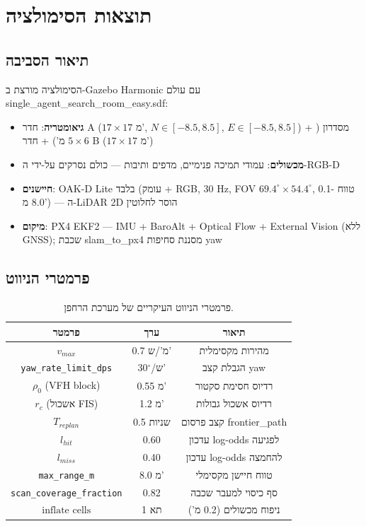 \documentclass[11pt,a4paper]{article}
\begin{document}
\section{תוצאות הסימולציה}

\subsection{תיאור הסביבה}

הסימולציה מורצת ב-\textenglish{Gazebo Harmonic} עם עולם \textenglish{single\_agent\_search\_room\_easy.sdf}:
\begin{itemize}
    \item \textbf{גיאומטריה}: חדר A ($17 \times 17$ מ', $N \in [-8.5, 8.5]$, $E \in [-8.5, 8.5]$) + מסדרון ($5 \times 6$ מ') + חדר B ($17 \times 17$ מ')
    \item \textbf{מכשולים}: עמודי תמיכה פנימיים, מדפים ותיבות — כולם נסרקים על-ידי ה-\textenglish{RGB-D}
    \item \textbf{חיישנים}: \textenglish{OAK-D Lite} בלבד (עומק + \textenglish{RGB}, 30 \textenglish{Hz}, \textenglish{FOV} $69.4^{\circ}\times54.4^{\circ}$, טווח 0.1-8.0 מ') — ה-\textenglish{LiDAR} 2D הוסר לחלוטין
    \item \textbf{מיקום}: \textenglish{PX4 EKF2} — \textenglish{IMU} + BaroAlt + Optical Flow + External Vision (ללא \textenglish{GNSS}); שכבת \textenglish{slam\_to\_px4} מסננת סחיפות \textenglish{yaw}
\end{itemize}

\subsection{פרמטרי הניווט}

\begin{table}[H]
\centering
\begin{tabular}{ccc}
\toprule
\textbf{פרמטר} & \textbf{ערך} & \textbf{תיאור} \\
\midrule
$v_{max}$ & 0.7 מ'/ש' & מהירות מקסימלית \\
\texttt{yaw\_rate\_limit\_dps} & 30$^{\circ}$/ש' & הגבלת קצב \textenglish{yaw} \\
$\rho_0$ (\textenglish{VFH block}) & 0.55 מ' & רדיוס חסימת סקטור \\
$r_c$ (אשכול \textenglish{FIS}) & 1.2 מ' & רדיוס אשכול גבולות \\
$T_{replan}$ & 0.5 שניות & קצב פרסום \textenglish{frontier\_path} \\
$l_{hit}$ & 0.60 & עדכון \textenglish{log-odds} לפגיעה \\
$l_{miss}$ & 0.40 & עדכון \textenglish{log-odds} להחמצה \\
\texttt{max\_range\_m} & 8.0 מ' & טווח חיישן מקסימלי \\
\texttt{scan\_coverage\_fraction} & 0.82 & סף כיסוי למעבר שכבה \\
$\text{inflate cells}$ & 1 תא & ניפוח מכשולים (0.2 מ') \\
\bottomrule
\end{tabular}
\caption{פרמטרי הניווט העיקריים של מערכת הרחפן.}
\label{tab:nav_params}
\end{table}
\end{document}
